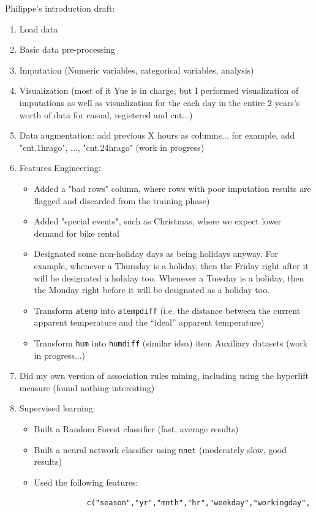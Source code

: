 \documentclass[12pt]{article}
\begin{document}
	Philippe's introduction draft:
	\begin{enumerate}
		\item Load data
		\item Basic data pre-processing
		\item Imputation (Numeric variables, categorical variables, analysis)
		\item Visualization (most of it Yue is in charge, but I performed visualization of imputations as well as visualization for the each day in the entire 2 years's worth of data for casual, registered and cnt...)
		\item Data augmentation: add previous X hours as columns... for example, add "cnt.1hrago", ..., "cnt.24hrago" (work in progress)
		\item Features Engineering:
		\begin{itemize}
			\item Added a "bad rows" column, where rows with poor imputation results are flagged and discarded from the training phase)
			\item Added "special events", such as Christmas, where we expect lower demand for bike rental
			\item Designated some non-holiday days as being holidays anyway. For example, whenever a Thursday is a holiday, then the Friday right after it will be designated a holiday too. Whenever a Tuesday is a holiday, then the Monday right before it will be designated as a holiday too.
			\item Transform \texttt{atemp} into \texttt{atempdiff} (i.e. the distance between the current apparent temperature and the ``ideal'' apparent temperature)
			\item Transform \texttt{hum} into \texttt{humdiff} (similar idea)
			item Auxiliary datasets (work in progress...)
		\end{itemize}
		\item Did my own version of association rules mining, including using the hyperlift measure (found nothing interesting)
		\item Supervised learning:
		\begin{itemize}
			\item Built a Random Forest classifier (fast, average results)
			\item Built a neural network classifier using \texttt{nnet} (moderately slow, good results)
			\item Used the following features:
			\begin{verbatim}
			c("season","yr","mnth","hr","weekday","workingday",

\end{verbatim}
\end{itemize}
\end{enumerate}
\end{document}

